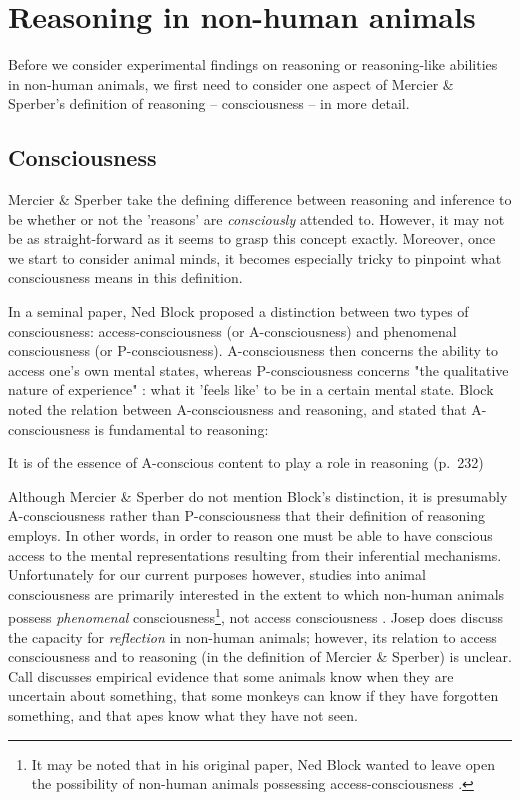 \section{Reasoning in non-human animals}
\label{sec:reason-phylogeny}

Before we consider experimental findings on reasoning or reasoning-like abilities in non-human animals, we first need to consider one aspect of Mercier \& Sperber's definition of reasoning -- consciousness -- in more detail.

\subsection{Consciousness}

Mercier \& Sperber take the defining difference between reasoning and inference to be whether or not the 'reasons' are \emph{consciously} attended to. However, it may not be as straight-forward as it seems to grasp this concept exactly. Moreover, once we start to consider animal minds, it becomes especially tricky to pinpoint what consciousness means in this definition.

In a seminal \citeyear{Block95} paper, Ned Block proposed a distinction between two types of consciousness: access-consciousness (or A-consciousness) and phenomenal consciousness (or P-consciousness). A-consciousness then concerns the ability to access one's own mental states, whereas P-consciousness concerns "the qualitative nature of experience" \citep[p.~52]{Andrews15}: what it 'feels like' to be in a certain mental state. 
Block noted the relation between A-consciousness and reasoning, and stated that A-consciousness is fundamental to reasoning:
\begin{quoting}
    It is of the essence of A-conscious content to play a role in reasoning
\hfill (p.~232)
\end{quoting}
Although Mercier \& Sperber do not mention Block's distinction, it is presumably A-consciousness rather than P-consciousness that their definition of reasoning employs. In other words, in order to reason one must be able to have conscious access to the mental representations resulting from their inferential mechanisms.
Unfortunately for our current purposes however, studies into animal consciousness are primarily interested in the extent to which non-human animals possess \emph{phenomenal} consciousness\footnote{It may be noted that in his original paper, Ned Block wanted to leave open the possibility of non-human animals possessing access-consciousness \citep{Block95}.}, not access consciousness \citep{Andrews15, Carruthers18}.
Josep \citet{Call06} does discuss the capacity for \emph{reflection} in non-human animals; however, its relation to access consciousness and to reasoning (in the definition of Mercier \& Sperber) is unclear. Call discusses empirical evidence that some animals know when they are uncertain about something, that some monkeys can know if they have forgotten something, and that apes know what they have not seen. 

